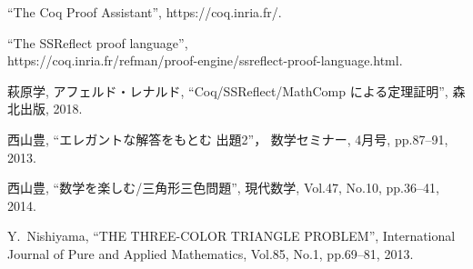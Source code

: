 
\begin{thebibliography}{99}

  ``The Coq Proof Assistant'',
  https://coq.inria.fr/. 

  ``The SSReflect proof language'',
  \\
  https://coq.inria.fr/refman/proof-engine/ssreflect-proof-language.html. 
  
  萩原学, アフェルド・レナルド, 
  ``Coq/SSReflect/MathComp による定理証明'',
  森北出版,
  2018. 
  
  西山豊,
  ``エレガントな解答をもとむ 出題2''，
  数学セミナー,
  4月号, pp.87--91, 2013.
  
  西山豊,
  ``数学を楽しむ/三角形三色問題'',
  現代数学,
  Vol.47, No.10, pp.36--41, 2014.
  
  Y.~Nishiyama,
  ``THE THREE-COLOR TRIANGLE PROBLEM'', 
  International Journal of Pure and Applied Mathematics,
  Vol.85, No.1, pp.69--81, 2013.

\end{thebibliography}
